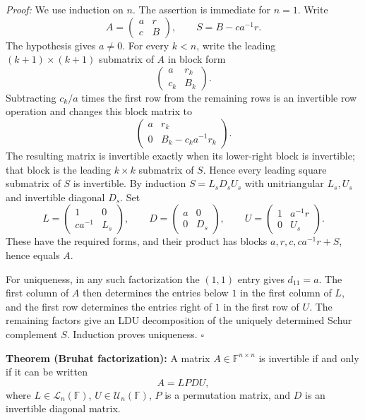 \documentclass[a4paper,11pt,abstract=true]{scrartcl}
\theoremstyle{dotlessP}
\theoremstyle{dotlessS}
\theoremstyle{remark}
\theoremstyle{definition}
\begin{document}
\begin{claim_box}
\textit{Proof:} We use induction on $n$. The assertion is immediate
for $n=1$. Write
\[
A=\begin{pmatrix}a&r\\c&B\end{pmatrix},
\qquad
S=B-ca^{-1}r.
\]
The hypothesis gives $a\neq0$. For every $k<n$, write the leading
$(k+1)\times(k+1)$ submatrix of $A$ in block form
\[
\begin{pmatrix}a&r_k\\c_k&B_k\end{pmatrix}.
\]
Subtracting $c_k/a$ times the first row from the remaining rows is an
invertible row operation and changes this block matrix to
\[
\begin{pmatrix}a&r_k\\0&B_k-c_ka^{-1}r_k\end{pmatrix}.
\]
The resulting matrix is invertible exactly when its lower-right block
is invertible; that block is the leading $k\times k$ submatrix of
$S$. Hence every leading square submatrix of $S$ is invertible. By
induction
$S=L_sD_sU_s$ with unitriangular $L_s,U_s$ and invertible diagonal
$D_s$. Set
\[
L=\begin{pmatrix}1&0\\ca^{-1}&L_s\end{pmatrix},\qquad
D=\begin{pmatrix}a&0\\0&D_s\end{pmatrix},\qquad
U=\begin{pmatrix}1&a^{-1}r\\0&U_s\end{pmatrix}.
\]
These have the required forms, and their product has blocks
$a,r,c,ca^{-1}r+S$, hence equals $A$.

For uniqueness, in any such factorization the $(1,1)$ entry gives
$d_{11}=a$. The first column of $A$ then determines the entries below
$1$ in the first column of $L$, and the first row determines the
entries right of $1$ in the first row of $U$. The remaining factors
give an LDU decomposition of the uniquely determined Schur complement
$S$. Induction proves uniqueness. \hfill$\square$
\end{claim_box}

\begin{problem_box}
\textbf{Theorem (Bruhat factorization):} A matrix
$A\in\mathbb{F}^{n\times n}$ is invertible if and only if it can be
written
\[
A=LPDU,
\]
where $L\in\mathcal{L}_n(\mathbb{F})$, $U\in\mathcal{U}_n(\mathbb{F})$,
$P$ is a permutation matrix, and $D$ is an invertible diagonal
matrix.
\end{problem_box}
\end{document}
